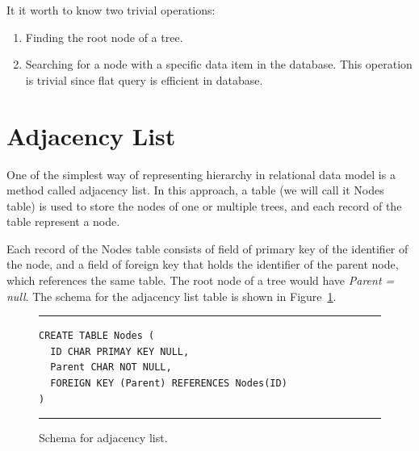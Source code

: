 It it worth to know two trivial operations:

\begin{enumerate}
\item Finding the root node of a tree. 
\item Searching for a node with a specific data item in the database. This operation is trivial since flat query is efficient in database.
\end{enumerate}




\section{Adjacency List}

One of the simplest way of representing hierarchy in relational data model is a method called adjacency list. In this approach, a table (we will call it Nodes table) is used to store the nodes of one or multiple trees, and each record of the table represent a node.

Each record of the Nodes table consists of field of primary key of the identifier of the node, and a field of foreign key that holds the identifier of the parent node, which references the same table. The root node of a tree would have {\em Parent = null}. The schema for the adjacency list table is shown in Figure~\ref{fig:adj_list}.


\begin{figure}[h]
\hrule\vspace{6px}
\begin{verbatim}
CREATE TABLE Nodes (
  ID CHAR PRIMAY KEY NULL,
  Parent CHAR NOT NULL,
  FOREIGN KEY (Parent) REFERENCES Nodes(ID)
)
\end{verbatim}
\hrule
\caption{Schema for adjacency list.\label{fig:adj_list}}
\end{figure}

